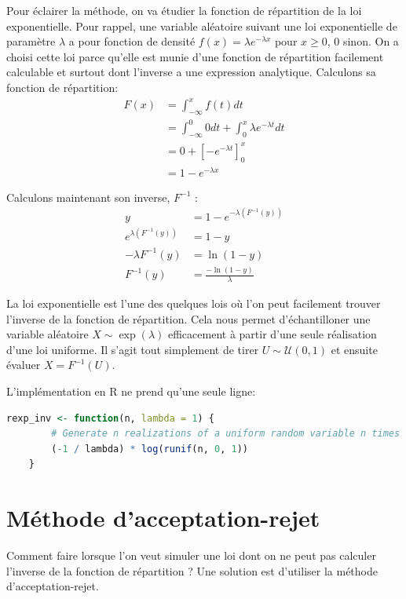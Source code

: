 \documentclass[10pt]{article} %
\begin{document}
Pour éclairer la méthode, on va étudier la fonction de répartition de la loi exponentielle. Pour rappel, une variable aléatoire suivant une loi exponentielle de paramètre
$\lambda$ a pour fonction de densité $f(x) = \lambda e^{-\lambda x}$ pour $x \geq 0$, $0$ sinon. On a choisi cette loi parce qu'elle est munie d'une fonction de répartition facilement calculable
et surtout dont l'inverse a une expression analytique. Calculons sa fonction de répartition:
\begin{align*}
    F(x) &= \int_{-\infty}^xf(t)dt \\
    & = \int_{-\infty}^0 0 dt + \int_0^x \lambda e^{-\lambda t} dt \\
    &= 0 + \left[-e^{-\lambda t}\right]_0^x \\
    &= 1 - e^{-\lambda x}
\end{align*}

Calculons maintenant son inverse, $F^{-1}$ :
\begin{align*}
    y &= 1 - e^{-\lambda (F^{-1}(y))} \\
    e^{\lambda (F^{-1}(y))} &= 1 - y \\
    -\lambda F^{-1}(y) &= \ln(1 - y) \\
    F^{-1}(y) &= \frac{-\ln(1 - y)}{\lambda}
\end{align*}

La loi exponentielle est l'une des quelques lois où l'on peut facilement trouver l'inverse de la fonction de répartition. Cela nous permet
d'échantilloner une variable aléatoire $X \sim \exp(\lambda)$ efficacement à partir d'une seule réalisation d'une loi uniforme. Il s'agit tout
simplement de tirer $U \sim \mathcal{U}(0, 1)$ et ensuite évaluer $X = F^{-1}(U)$.

L'implémentation en R ne prend qu'une seule ligne:

\begin{lstlisting}[language=R]
    rexp_inv <- function(n, lambda = 1) {
        # Generate n realizations of a uniform random variable n times
        (-1 / lambda) * log(runif(n, 0, 1))
    }
\end{lstlisting}







\section{Méthode d'acceptation-rejet}

Comment faire lorsque l'on veut simuler une loi dont on ne peut pas calculer l'inverse de la fonction de répartition ? Une solution est d'utiliser la méthode d'acceptation-rejet.
\end{document}
